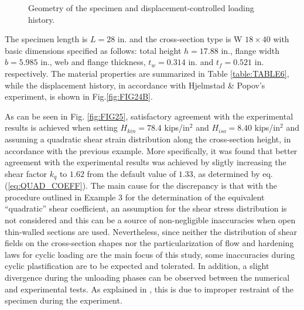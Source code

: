 \begin{figure}[H]
	\centering
	\caption{Geometry of the specimen and displacement-controlled loading 
		history.}
	\label{fig:FIG24}
\end{figure}

The specimen length is $L=28$ in. and the cross-section type is W $18\times40$ 
with basic dimensions 
specified as follows: total height $h=17.88$ in., flange width $b=5.985$ in., 
web and flange thickness, $t_w=0.314$ in. and $t_f=0.521$ in. respectively. The 
material properties are summarized in Table \ref{table:TABLE6}, while the 
displacement history, in 
accordance with Hjelmstad \& Popov's experiment, is shown in 
Fig.\ref{fig:FIG24B}. 


 As can be seen in Fig. \ref{fig:FIG25}, satisfactory agreement with the 
 experimental results is achieved when setting 
$H_{kin}=78.4$ kips/in${}^2$ and $H_{iso} = 8.40$ kips/in${}^2$ and assuming 
a quadratic shear strain distribution along the cross-section height, in 
accordance with the previous example. More specifically, it was found that 
better agreement with the experimental results was achieved by sligtly 
increasing the shear factor $k_q$ to $1.62$ from the default value of $1.33$, 
as determined by eq. (\ref{eq:QUAD_COEFF}). The main cause for the discrepancy 
is that with the procedure outlined in Example 3 for the determination of the 
equivalent ``quadratic'' shear coefficient, an assumption for the shear stress 
distribution is not considered and this can be a source of non-negligible 
inaccuracies when open thin-walled sections are used. Nevertheless, since 
neither the distribution of shear fields on the cross-section shapes nor the 
particularization of flow and hardening laws for cyclic loading are the main 
focus of this study, some inaccuracies during cyclic plastification are to be 
expected and tolerated. In addition, a slight divergence during the unloading 
phases can be observed between the numerical and experimental tests. As 
explained in \cite{Saritas2009}, this is due to 
improper restraint of the specimen during the experiment.

